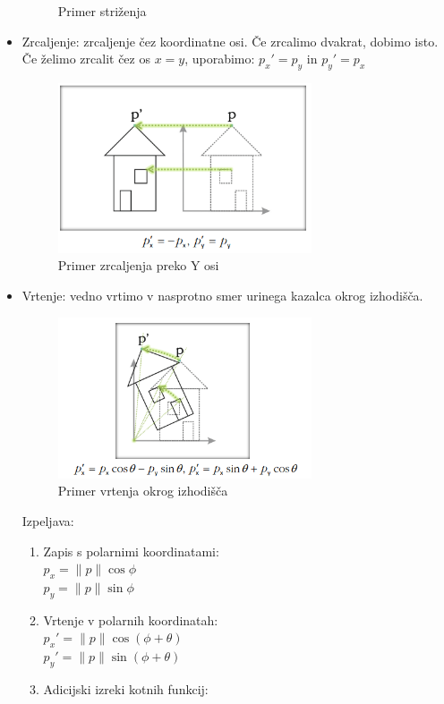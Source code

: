 \documentclass{article}
\begin{document}
\begin{itemize}
\begin{figure}[H]
    \caption{Primer striženja}
    \end{figure} 
    \item Zrcaljenje: zrcaljenje čez koordinatne osi. Če zrcalimo dvakrat, dobimo isto. Če želimo zrcalit čez os $x = y$, uporabimo: $p_x' = p_y$ in $p_y' = p_x$
    \begin{figure}[H]
    \centering
    \includegraphics[width=75mm]{src/zrcaljenje.png}
    \caption{Primer zrcaljenja preko Y osi}
    \end{figure} 
    \item Vrtenje: vedno vrtimo v nasprotno smer urinega kazalca okrog izhodišča. 
    \begin{figure}[H]
    \centering
    \includegraphics[width=75mm]{src/vrtenje.png}
    \caption{Primer vrtenja okrog izhodišča}
    \end{figure}     
    Izpeljava:
    \begin{enumerate}
        \item Zapis s polarnimi koordinatami: \\
        $p_x = \lVert p \rVert \cos{\phi}$ \\
        $p_y = \lVert p \rVert \sin{\phi}$
        \item Vrtenje v polarnih koordinatah: \\
        $p_x' = \lVert p \rVert \cos{(\phi + \theta)}$ \\
        $p_y' = \lVert p \rVert \sin{(\phi + \theta)}$
        \item Adicijski izreki kotnih funkcij: \\

\end{enumerate}
\end{itemize}
\end{document}
